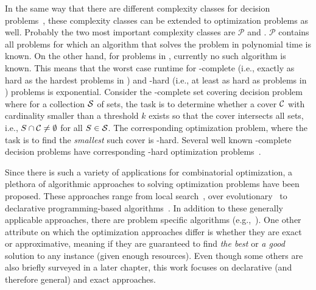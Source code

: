 In the same way that there are different complexity classes for decision problems~\autocite{AroraBarak2009-complexity}, these complexity classes can be extended to optimization problems as well.
Probably the two most important complexity classes are $\mathcal{P}$ and \NP.
$\mathcal{P}$ contains all problems for which an algorithm that solves the problem in polynomial time is known.
On the other hand, for problems in \NP, currently no such algorithm is known.
This means that the worst case runtime for \NP-complete (i.e., exactly as hard as the hardest problems in \NP) and \NP-hard (i.e., at least as hard as problems in \NP) problems is exponential.
Consider the \NP-complete set covering decision problem~\autocite{DBLP:conf/coco/Karp72} where for a collection $\mathcal{S}$ of sets, the task is to determine whether a cover $\mathcal{C}$ with cardinality smaller than a threshold $k$ exists so that the cover intersects all sets, i.e., $S \cap \mathcal{C} \neq \emptyset$ for all $S\in\mathcal{S}$.
The corresponding optimization problem, where the task is to find the \emph{smallest} such cover is \NP-hard.
Several well known \NP-complete decision problems have corresponding \NP-hard optimization problems~\autocite{KorteVygen2018-15}.

Since there is such a variety of applications for combinatorial optimization, a plethora of algorithmic approaches to solving optimization problems have been proposed.
These approaches range from local search~\autocite{DBLP:books/daglib/0017492}, over evolutionary~\autocites{DBLP:books/daglib/0087893,DBLP:journals/jgo/StornP97} to declarative programming-based algorithms~\autocite{handbook2-maxsat,ChenEtAl2010-intro,DBLP:reference/fai/2}.
In addition to these generally applicable approaches, there are problem specific algorithms (e.g.,~\autocite{DBLP:conf/aaai/DemirovicS21,DBLP:conf/kdd/NijssenF07,DBLP:conf/nips/HuRS19}).
One other attribute on which the optimization approaches differ is whether they are exact or approximative, meaning if they are guaranteed to find \emph{the best} or \emph{a good} solution to any instance (given enough resources).
Even though some others are also briefly surveyed in a later chapter, this work focuses on declarative (and therefore general) and exact approaches.

